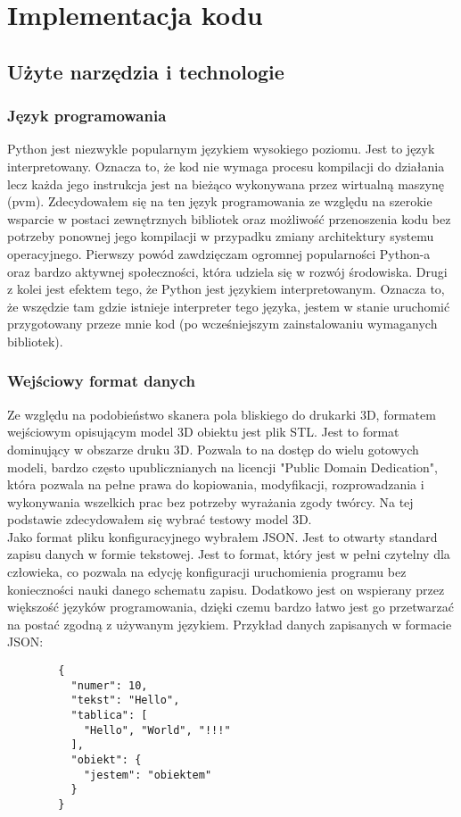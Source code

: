 \documentclass[a4paper,12pt,twoside,openany]{report}
\begin{document}
\chapter{Implementacja kodu}
  \section{Użyte narzędzia i technologie}
    \subsection{Język programowania}
      Python jest niezwykle popularnym językiem wysokiego poziomu.
      Jest to język interpretowany. Oznacza to, że kod nie wymaga procesu kompilacji 
      do działania lecz każda jego instrukcja jest na bieżąco wykonywana przez wirtualną maszynę (pvm).
      Zdecydowałem się na ten język programowania ze względu na szerokie wsparcie w postaci 
      zewnętrznych bibliotek oraz możliwość przenoszenia kodu bez potrzeby ponownej jego kompilacji 
      w przypadku zmiany architektury systemu operacyjnego. Pierwszy powód zawdzięczam ogromnej 
      popularności Python-a oraz bardzo aktywnej społeczności, która udziela się w rozwój środowiska.
      Drugi z kolei jest efektem tego, że Python jest językiem interpretowanym. Oznacza to, że wszędzie tam 
      gdzie istnieje interpreter tego języka, jestem w stanie uruchomić przygotowany przeze mnie kod
      (po wcześniejszym zainstalowaniu wymaganych bibliotek).
    
    \subsection{Wejściowy format danych}
      Ze względu na podobieństwo skanera pola bliskiego do drukarki 3D, formatem wejściowym opisującym 
      model 3D obiektu jest plik STL. Jest to format dominujący w obszarze druku 3D. Pozwala to na 
      dostęp do wielu gotowych modeli, bardzo często upublicznianych na licencji "Public Domain Dedication", 
      która pozwala na pełne prawa do kopiowania, modyfikacji, rozprowadzania i wykonywania wszelkich prac 
      bez potrzeby wyrażania zgody twórcy. Na tej podstawie zdecydowałem się wybrać testowy model 3D.\\
      Jako format pliku konfiguracyjnego wybrałem JSON. Jest to otwarty standard zapisu danych w formie 
      tekstowej. Jest to format, który jest w pełni czytelny dla człowieka, co pozwala na edycję konfiguracji 
      uruchomienia programu bez konieczności nauki danego schematu zapisu. Dodatkowo jest on wspierany przez 
      większość języków programowania, dzięki czemu bardzo łatwo jest go przetwarzać na postać zgodną z 
      używanym językiem. Przykład danych zapisanych w formacie JSON:
      \begin{lstlisting}
        {
          "numer": 10,
          "tekst": "Hello",
          "tablica": [
            "Hello", "World", "!!!"
          ],
          "obiekt": {
            "jestem": "obiektem"
          }
        }
      \end{lstlisting}
\end{document}
